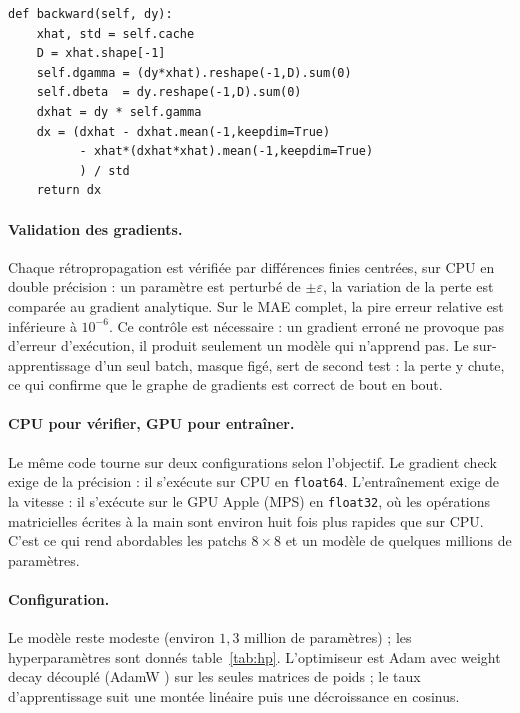 \documentclass[twocolumn,10pt,a4paper]{article}
\begin{document}
\begin{lstlisting}[caption={Rétropropagation manuelle de LayerNorm.},label={lst:ln}]
def backward(self, dy):
    xhat, std = self.cache
    D = xhat.shape[-1]
    self.dgamma = (dy*xhat).reshape(-1,D).sum(0)
    self.dbeta  = dy.reshape(-1,D).sum(0)
    dxhat = dy * self.gamma
    dx = (dxhat - dxhat.mean(-1,keepdim=True)
          - xhat*(dxhat*xhat).mean(-1,keepdim=True)
          ) / std
    return dx
\end{lstlisting}

\paragraph{Validation des gradients.}
Chaque rétropropagation est vérifiée par différences finies centrées, sur CPU en double précision :
un paramètre est perturbé de $\pm\varepsilon$, la variation de la perte est comparée au gradient
analytique. Sur le MAE complet, la pire erreur relative est inférieure à $10^{-6}$. Ce contrôle est
nécessaire : un gradient erroné ne provoque pas d'erreur d'exécution, il produit seulement un modèle
qui n'apprend pas. Le sur-apprentissage d'un seul batch, masque figé, sert de second test : la perte
y chute, ce qui confirme que le graphe de gradients est correct de bout en bout.

\paragraph{CPU pour vérifier, GPU pour entraîner.}
Le même code tourne sur deux configurations selon l'objectif. Le gradient check exige de la
précision : il s'exécute sur CPU en \texttt{float64}. L'entraînement exige de la vitesse : il
s'exécute sur le GPU Apple (MPS) en \texttt{float32}, où les opérations matricielles écrites à la
main sont environ huit fois plus rapides que sur CPU. C'est ce qui rend abordables les patchs
$8\times 8$ et un modèle de quelques millions de paramètres.

\paragraph{Configuration.}
Le modèle reste modeste (environ $1{,}3$ million de paramètres) ; les hyperparamètres sont donnés
table~\ref{tab:hp}. L'optimiseur est Adam \cite{kingma2015adam} avec weight decay découplé (AdamW
\cite{loshchilov2019adamw}) sur les seules matrices de poids ; le taux d'apprentissage suit une
montée linéaire puis une décroissance en cosinus.
\end{document}
